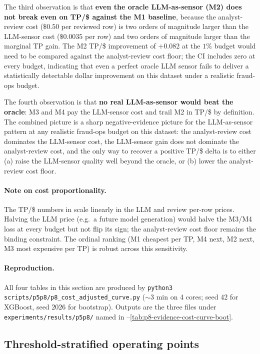 The third observation is that \textbf{even the oracle LLM-as-sensor
(M2) does not break even on TP/\$ against the M1 baseline}, because
the analyst-review cost ($\$0.50$ per reviewed row) is two orders of
magnitude larger than the LLM-sensor cost ($\$0.0035$ per row) and
two orders of magnitude larger than the marginal TP gain. The M2 TP/\$
improvement of $+0.082$ at the $1\%$ budget would need to be compared
against the analyst-review cost floor; the CI includes zero at every
budget, indicating that even a perfect oracle LLM sensor fails to
deliver a statistically detectable dollar improvement on this dataset
under a realistic fraud-ops budget.

The fourth observation is that \textbf{no real LLM-as-sensor would beat
the oracle}: M3 and M4 pay the LLM-sensor cost and trail M2 in TP/\$
by definition. The combined picture is a sharp negative-evidence
picture for the LLM-as-sensor pattern at any realistic fraud-ops
budget on this dataset: the analyst-review cost dominates the
LLM-sensor cost, the LLM-sensor gain does not dominate the
analyst-review cost, and the only way to recover a positive TP/\$
delta is to either (a) raise the LLM-sensor quality well beyond the
oracle, or (b) lower the analyst-review cost floor.

\paragraph{Note on cost proportionality.} The TP/\$ numbers in
 scale linearly in the LLM and
review per-row prices. Halving the LLM price (e.g.\ a future model
generation) would halve the M3/M4 loss at every budget but not flip
its sign; the analyst-review cost floor remains the binding
constraint. The ordinal ranking (M1 cheapest per TP, M4 next, M2 next,
M3 most expensive per TP) is robust across this sensitivity.

\paragraph{Reproduction.} All four tables in this section are produced
by \texttt{python3 scripts/p5p8/p8\_cost\_adjusted\_curve.py}
($\sim$3 min on 4 cores; seed $42$ for XGBoost, seed $2026$ for
bootstrap). Outputs are the three files under
\texttt{experiments/results/p5p8/} named in
--\ref{tab:p8-evidence-cost-curve-boot}.

\subsection{Threshold-stratified operating points}
\label{sec:p8-evidence-threshold}

